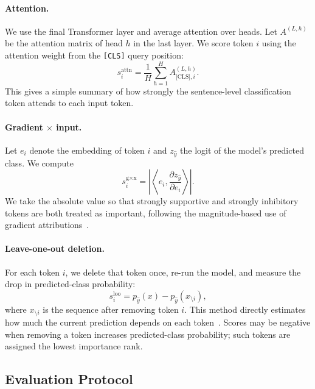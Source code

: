 \paragraph{Attention.}
We use the final Transformer layer and average attention over heads. Let $A^{(L,h)}$ be the attention matrix of head $h$ in the last layer. We score token $i$ using the attention weight from the \texttt{[CLS]} query position:
\begin{equation}
s_i^{\text{attn}} = \frac{1}{H}\sum_{h=1}^{H} A^{(L,h)}_{\text{[CLS]},i}.
\end{equation}
This gives a simple summary of how strongly the sentence-level classification token attends to each input token.

\paragraph{Gradient $\times$ input.}
Let $e_i$ denote the embedding of token $i$ and $z_{\hat{y}}$ the logit of the model's predicted class. We compute
\begin{equation}
s_i^{\text{g}\times\text{x}} = \left|\left\langle e_i,\frac{\partial z_{\hat{y}}}{\partial e_i}\right\rangle\right|.
\end{equation}
We take the absolute value so that strongly supportive and strongly inhibitory tokens are both treated as important, following the magnitude-based use of gradient attributions~\cite{ancona2018towards}.

\paragraph{Leave-one-out deletion.}
For each token $i$, we delete that token once, re-run the model, and measure the drop in predicted-class probability:
\begin{equation}
s_i^{\text{loo}} = p_{\hat{y}}(x) - p_{\hat{y}}(x_{\setminus i}),
\end{equation}
where $x_{\setminus i}$ is the sequence after removing token $i$. This method directly estimates how much the current prediction depends on each token~\cite{li2017erasure}. Scores may be negative when removing a token increases predicted-class probability; such tokens are assigned the lowest importance rank.

\subsection{Evaluation Protocol}

